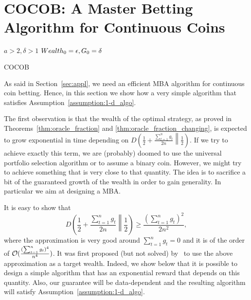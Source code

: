\section{COCOB: A Master Betting Algorithm for Continuous Coins}
\label{sec:algo}

\begin{algorithm}[ht]
  \begin{algorithmic}
  {
     $a>2,\delta>1$
     $Wealth_0=\epsilon,G_0=\delta$
    \ENDFOR
  }
  \end{algorithmic}
  \caption{COCOB}
  \label{alg:cocob}
\end{algorithm}

As said in Section~\ref{sec:appl}, we need an efficient \ac{MBA} algorithm for continuous coin betting.
Hence, in this section we show how a very simple algorithm that satisfies Assumption~\ref{assumption:1-d_algo}.

The first observation is that the wealth of the optimal strategy, as proved in Theorems~\ref{thm:oracle_fraction} and \ref{thm:oracle_fraction_changing}, is expected to grow exponential in time depending on $D\left(\frac{1}{2}+\frac{\sum_{t=1}^n g_t}{2 n}\middle\|\frac{1}{2}\right)$. If we try to achieve exactly this term, we are (probably) doomed to use the universal portfolio selection algorithm or to assume a binary coin.
However, we might try to achieve something that is very close to that quantity.
The idea is to sacrifice a bit of the guaranteed growth of the wealth in order to gain generality. In particular we aim at designing a \ac{MBA}.

It is easy to show that
\[
D\left(\frac{1}{2}+\frac{\sum_{t=1}^n g_t}{2 n}\middle\|\frac{1}{2}\right) \geq \frac{(\sum_{t=1}^n g_t)^2}{2 n^2},
\]
where the approximation is very good around $\sum_{t=1}^n g_t=0$ and it is of the order of $\mathcal{O}(\frac{(\sum_{t=1}^n g_t)^4}{ n^4})$. It was first proposed (but not solved) by~\cite{McMahanA13} to use the above approximation as a target wealth.
Indeed, we show below that it is possible to design a simple algorithm that has an exponential reward that depends on this quantity. Also, our guarantee will be data-dependent and the resulting algorithm will satisfy Assumption~\ref{assumption:1-d_algo}.

